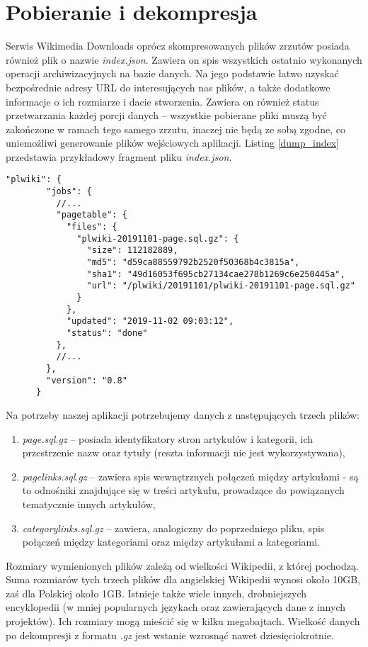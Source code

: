 \section{Pobieranie i dekompresja}
\label{sec:data-download}
Serwis Wikimedia Downloads oprócz skompresowanych plików zrzutów posiada również plik o nazwie \textit{index.json}. Zawiera on spis wszystkich ostatnio wykonanych operacji archiwizacyjnych na bazie danych. Na jego podstawie łatwo uzyskać bezpośrednie adresy URL do interesujących nas plików, a także dodatkowe informacje o ich rozmiarze i dacie stworzenia. Zawiera on również status przetwarzania każdej porcji danych – wszystkie pobierane pliki muszą być zakończone w ramach tego samego zrzutu, inaczej nie będą ze sobą zgodne, co uniemożliwi generowanie plików wejściowych aplikacji. Listing \ref{dump_index} przedstawia przykładowy fragment pliku \textit{index.json}.

\begin{lstlisting}[frame=single,caption={Fragment informacji o ostatnim zrzucie bazy danych polskiej Wikipedii},label=dump_index]
    "plwiki": {
        "jobs": {
          //...
          "pagetable": {
            "files": {
              "plwiki-20191101-page.sql.gz": {
                "size": 112182889,
                "md5": "d59ca88559792b2520f50368b4c3815a",
                "sha1": "49d16053f695cb27134cae278b1269c6e250445a",
                "url": "/plwiki/20191101/plwiki-20191101-page.sql.gz"
              }
            },
            "updated": "2019-11-02 09:03:12",
            "status": "done"
          },
          //...
        },
        "version": "0.8"
      }      
\end{lstlisting}

Na potrzeby naszej aplikacji potrzebujemy danych z następujących trzech plików:

\begin{enumerate}[label=\textbullet]
    \item \textit{page.sql.gz} – posiada identyfikatory stron artykułów i kategorii, ich przestrzenie nazw oraz tytuły (reszta informacji nie jest wykorzystywana),
    \item \textit{pagelinks.sql.gz} – zawiera spis wewnętrznych połączeń między artykułami - są to odnośniki znajdujące się w treści artykułu, prowadzące do powiązanych tematycznie innych artykułów,
    \item \textit{categorylinks.sql.gz} – zawiera, analogiczny do poprzedniego pliku, spis połączeń między kategoriami oraz między artykułami a kategoriami.
\end{enumerate}

Rozmiary wymienionych plików zależą od wielkości Wikipedii, z której pochodzą. Suma rozmiarów tych trzech plików dla angielskiej Wikipedii wynosi około 10GB, zaś dla Polskiej około 1GB. Istnieje także wiele innych, drobniejszych encyklopedii (w mniej popularnych językach oraz zawierających dane z innych projektów). Ich rozmiary mogą mieścić się w kilku megabajtach. Wielkość danych po dekompresji z formatu \textit{.gz} jest wstanie wzrosnąć nawet dziesięciokrotnie.